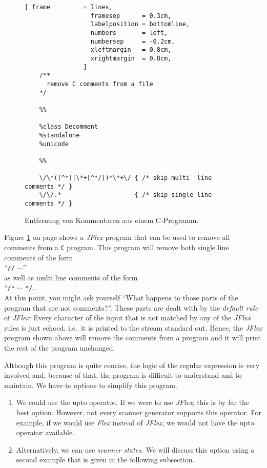 \begin{figure}[!h]
\centering
\begin{Verbatim}[ frame         = lines, 
                  framesep      = 0.3cm, 
                  labelposition = bottomline,
                  numbers       = left,
                  numbersep     = -0.2cm,
                  xleftmargin   = 0.8cm,
                  xrightmargin  = 0.8cm,
                ]
    /**
      remove C comments from a file 
    */
    
    %%
    
    %class Decomment
    %standalone
    %unicode
    
    %%
    
    \/\*([^*]|\*+[^*/])*\*+\/ { /* skip multi  line comments */ }
    \/\/.*                    { /* skip single line comments */ }
\end{Verbatim}
\vspace*{-0.3cm}
\caption{Entfernung von Kommentaren aus einem C-Programm.}
\label{fig:decomment.jflex}
\end{figure}

\noindent
Figure \ref{fig:decomment.jflex} on page \pageref{fig:decomment.jflex} shows a \textsl{JFlex}
program that can be used to remove all comments from a \texttt{C} program.  This program will remove
both single line comments of the form
\\[0.2cm]
\hspace*{1.3cm}
 ``\texttt{//} $\cdots$''
\\[0.2cm]
as well as multi line comments of the form
\\[0.2cm]
\hspace*{1.3cm}
``\texttt{/*} $\cdots$ \texttt{*/}. 
\\[0.2cm]
At this point, you might ask yourself ``What happens to those parts of the program that are not comments?''.
These parts are dealt with by the  \emph{default rule} of \textsl{JFlex}:  Every character of the
input that is not matched by any of the \textsl{JFlex} rules is just echoed, i.e.~it is printed to
the stream standard out.   Hence, the \textsl{JFlex} program shown above will remove the comments from a
program and it will print the rest of the program unchanged.

Although this program is quite concise, the logic of the regular expression is very involved and,
because of that, the program is difficult to understand and to maintain. 
We have to options to simplify this program.
\begin{enumerate}
\item We could use the upto operator.  If we were to use \textsl{JFlex}, this is by far the best
      option.  However, not every scanner generator supports this operator.  For example, if we
      would use \textsl{Flex} instead of \textsl{JFlex}, we would not have the upto operator available.
\item Alternatively, we can use \emph{scanner states}.
      We will discuss this option using a second example that is given in the following subsection.
\end{enumerate}

